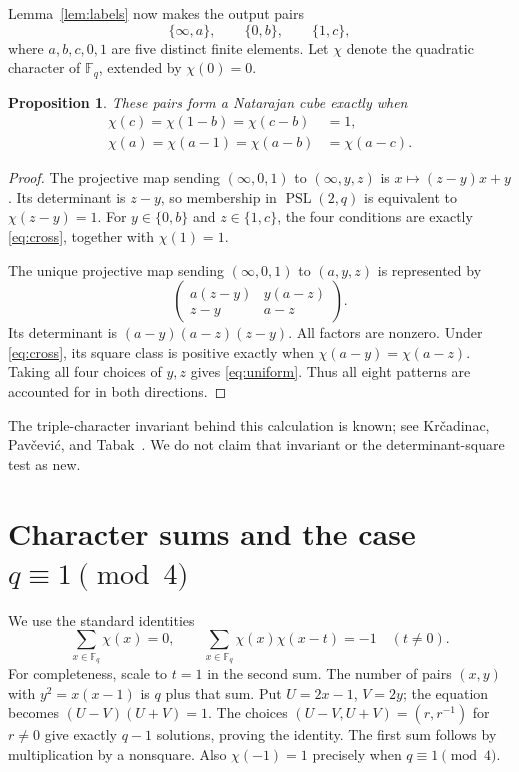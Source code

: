 \documentclass[11pt,a4paper]{article}
\newtheorem{proposition}{Proposition}
\DeclareMathOperator{\PSL}{PSL}
\newcommand{\F}{\mathbb{F}}
\begin{document}
Lemma~\ref{lem:labels} now makes the output pairs
\[
\{\infty,a\},\qquad\{0,b\},\qquad\{1,c\},
\]
where $a,b,c,0,1$ are five distinct finite elements. Let $\chi$ denote the
quadratic character of $\F_q$, extended by $\chi(0)=0$.

\begin{proposition}\label{prop:criterion}
These pairs form a Natarajan cube exactly when
\begin{align}
\chi(c)=\chi(1-b)=\chi(c-b)&=1,\label{eq:cross}\\
\chi(a)=\chi(a-1)=\chi(a-b)&=\chi(a-c).\label{eq:uniform}
\end{align}
\end{proposition}
\begin{proof}
The projective map sending $(\infty,0,1)$ to $(\infty,y,z)$ is
$x\mapsto(z-y)x+y$. Its determinant is $z-y$, so membership in $\PSL(2,q)$
is equivalent to $\chi(z-y)=1$. For $y\in\{0,b\}$ and $z\in\{1,c\}$,
the four conditions are exactly \eqref{eq:cross}, together with $\chi(1)=1$.

The unique projective map sending $(\infty,0,1)$ to $(a,y,z)$ is represented by
\[
\begin{pmatrix}
a(z-y)&y(a-z)\\
z-y&a-z
\end{pmatrix}.
\]
Its determinant is $(a-y)(a-z)(z-y)$. All factors are nonzero. Under
\eqref{eq:cross}, its square class is positive exactly when
$\chi(a-y)=\chi(a-z)$. Taking all four choices of $y,z$ gives
\eqref{eq:uniform}. Thus all eight patterns are accounted for in both directions.
\end{proof}

The triple-character invariant behind this calculation is known; see
Kr\v{c}adinac, Pav\v{c}evi\'{c}, and Tabak~\cite[Lemma~2.2]{kpt}.
We do not claim that invariant or the determinant-square test as new.

\section{Character sums and the case \texorpdfstring{$q\equiv1\pmod4$}{q = 1 (mod 4)}}
We use the standard identities
\begin{equation}\label{eq:sums}
\sum_{x\in\F_q}\chi(x)=0,\qquad
\sum_{x\in\F_q}\chi(x)\chi(x-t)=-1\quad(t\ne0).
\end{equation}
For completeness, scale to $t=1$ in the second sum. The number of pairs
$(x,y)$ with $y^2=x(x-1)$ is $q$ plus that sum. Put $U=2x-1$, $V=2y$;
the equation becomes $(U-V)(U+V)=1$. The choices $(U-V,U+V)=(r,r^{-1})$
for $r\ne0$ give exactly $q-1$ solutions, proving the identity. The first
sum follows by multiplication by a nonsquare. Also $\chi(-1)=1$ precisely
when $q\equiv1\pmod4$.
\end{document}
